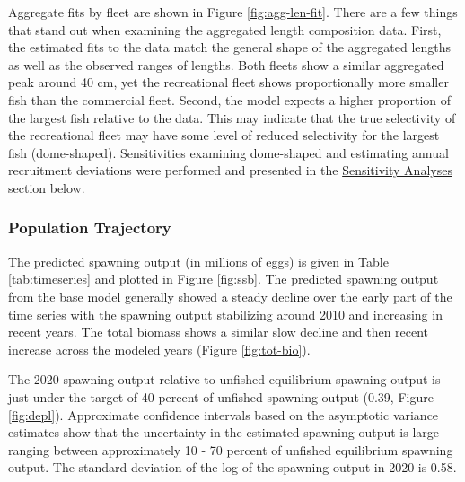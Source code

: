 \documentclass[11pt,
  english,
  a4paper,
]{article}
\begin{document}
\leavevmode\tagmcend\tagstructend\par


Aggregate fits by fleet are shown in Figure \ref{fig:agg-len-fit}. There are a few things that stand out when examining the aggregated length composition data. First, the estimated fits to the data match the general shape of the aggregated lengths as well as the observed ranges of lengths. Both fleets show a similar aggregated peak around 40 cm, yet the recreational fleet shows proportionally more smaller fish than the commercial fleet. Second, the model expects a higher proportion of the largest fish relative to the data. This may indicate that the true selectivity of the recreational fleet may have some level of reduced selectivity for the largest fish (dome-shaped). Sensitivities examining dome-shaped and estimating annual recruitment deviations were performed and presented in the {\protect\hyperlink{sensitivity-analyses}{Sensitivity Analyses}\leavevmode\tagmcend\tagstructend} section below.

\leavevmode\tagmcend\tagstructend\par


\hypertarget{population-trajectory}{%
\subsubsection{Population Trajectory}\label{population-trajectory}}

\leavevmode\tagmcend\tagstructend


The predicted spawning output (in millions of eggs) is given in Table \ref{tab:timeseries} and plotted in Figure \ref{fig:ssb}. The predicted spawning output from the base model generally showed a steady decline over the early part of the time series with the spawning output stabilizing around 2010 and increasing in recent years. The total biomass shows a similar slow decline and then recent increase across the modeled years (Figure \ref{fig:tot-bio}).

\leavevmode\tagmcend\tagstructend\par


The 2020 spawning output relative to unfished equilibrium spawning output is just under the target of 40 percent of unfished spawning output (0.39, Figure \ref{fig:depl}). Approximate confidence intervals based on the asymptotic variance estimates show that the uncertainty in the estimated spawning output is large ranging between approximately 10 - 70 percent of unfished equilibrium spawning output. The standard deviation of the log of the spawning output in 2020 is 0.58.
\end{document}
